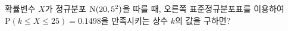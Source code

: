 \noindent\begin{minipage}[t]{0.58\linewidth}\vspace{0pt}\raggedright 확률변수 $X$가 정규분포 $\mathrm{N}(20{,}\mkern3mu\mathopen{}5^2)$을 따를 때, 오른쪽 표준정규분포표를 이용하여 $\mathrm{P}(k\le X\le 25)=0.1498$을 만족시키는 상수 $k$의 값을 구하면?\end{minipage}\hfill\begin{minipage}[t]{0.4\linewidth}\vspace{0pt}\centering \resizebox{\ifdim\width>\linewidth\linewidth\else\width\fi}{!}{}\end{minipage}\par
{}

